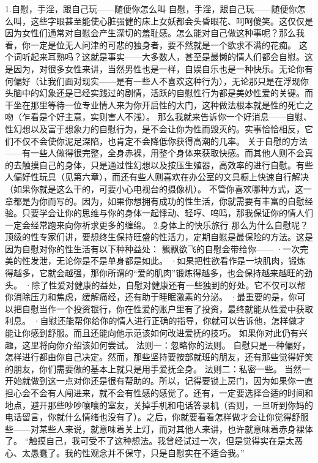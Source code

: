\documentclass[12pt,UTF8]{ctexbook}
\begin{document}
1.自慰，手淫，跟自己玩——随便你怎么叫
自慰，手淫，跟自己玩——随便你怎么叫，这些字眼甚至能使心脏强健的床上女妖都会头昏眼花、呵呵傻笑。这仅仅是因为女性们通常对自慰会产生深切的羞耻感。怎么能对自己做这种事呢？那么我看，你一定是位无人问津的可悲的独身者，要不然就是一个欲求不满的花痴。
这个词听起来耳熟吗？这就是事实——大多数人，甚至是最懒的情人们都会自慰。这是因为，对很多女性来讲，当然男性也是一样，自娱自乐也是一种快乐。无论你有何偏好（让我们面对现实——是有一些人不喜欢这种行为），无论那只是在浮现你头脑中的幻象还是已经实践过的剧情，活跃的自慰性行为都是美妙性爱的关键。而干坐在那里等待一位专业情人来为你开启性的大门，这种做法根本就是性的死亡之吻（乍看是个好主意，实则害人不浅）。
那么我就来告诉你一个好消息——自慰、性幻想以及富于想象力的自慰行为，是不会让你为性而毁灭的。实事恰恰相反，它们不仅不会使你泥足深陷，也肯定不会降低你获得高潮的几率。
关于自慰的方法——有一些人做得很完整，全身赤裸，用整个身体来获取快感。而其他人则不会真的去触摸自己的身体，只是通过性幻想以及按压生殖器，高效率的进行自慰。有些人偏好性玩具（见第六章），而还有些人则喜欢在办公室的文具橱上快速自行解决（如果你就是这么干的，可要小心电视台的摄像机）。
不管你喜欢哪种方式，这一章都是为你而写的。因为，如果你想拥有成功的性生活，你就需要有丰富的自慰经验。只要学会让你的思维与你的身体一起悸动、轻哼、呜鸣，那我保证你的情人们一定会经常跑来向你祈求更多的缠绵。
2.身体上的快乐旅行
那么为什么自慰呢？顶级的性专家们讲，要想终生保持旺盛的性活力，定期自慰是最保险的方法。这是因为自慰对你的性生活有以下种种益处：
飘飘欲飞的自慰会带给你——
·一次完美的性发泄，无论你是不是单身都是如此。
·如果把性欲看作是一块肌肉，锻炼得越多，它就会越强，那你所谓的“爱的肌肉”锻炼得越多，也会保持越来越旺的劲头。
·除了性爱对健康的益处，自慰对健康还有一些独到的好处。它不仅可以帮你消除压力和焦虑，缓解痛经，还有助于睡眠激素的分泌。
·最重要的是，你可以把自慰当作一个投资银行，你在性爱的账户里有了投资，最终就能从性爱中获取利息。
·自慰还能帮你给你的情人进行正确的指导，你就可以告诉他，怎样做才能让你感到舒服。而且还能向他示范该如何改进爱抚的技巧。
如果你对此仍有兴趣，这里将向你介绍该如何尝试。
法则一：忽略你的法则。
自慰只是一种偏好，怎样进行都由你自己决定。然而，那些坚持要按部就班的朋友，还有那些觉得好笑的朋友，你们需要做的基本上就只是用手爱抚全身。
法则二：私密一些。
当然一开始就做到这一点对你还是很有帮助的。所以，记得要锁上房门，因为如果你一直担心会不会有人闯进来，就不会有性感的感觉了。还有，一定要选择合适的时间和地点，避开那些吵吵嚷嚷的室友，关掉手机和电话答录机（否则，一旦听到你妈的电话留言，你就什么情绪也没有了）。之后，你就要看看怎样做才会让你觉得舒服些——对某些人来说，就意味着关上灯，而对其他人来讲，也许就意味着赤身裸体了。
“触摸自己，我可受不了这种想法。我曾经试过一次，但是觉得实在是太恶心、太愚蠢了。我的性观念并不保守，只是自慰实在不适合我。”
\end{document}
